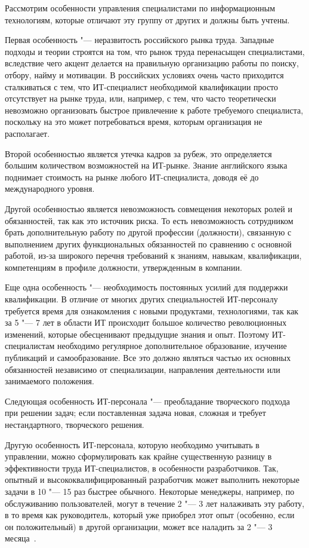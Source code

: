 \documentclass{../industrial-development}
\begin{document}
\lecturenotes

Рассмотрим особенности управления специалистами по информационным технологиям, которые отличают эту группу от других и должны быть учтены. 

Первая особенность "--- \alert{неразвитость российского рынка труда}. Западные подходы и теории строятся на том, что рынок труда перенасыщен специалистами, вследствие чего акцент делается на правильную организацию работы по поиску, отбору, найму и мотивации. В российских условиях очень часто приходится сталкиваться с тем, что ИТ-специалист необходимой квалификации просто отсутствует на рынке труда, или, например, с тем, что часто теоретически невозможно организовать быстрое привлечение к работе требуемого специалиста, поскольку на это может потребоваться время, которым организация не располагает. 

Второй особенностью является \alert{утечка кадров за рубеж}, это определяется большим количеством возможностей на ИТ-рынке. Знание английского языка поднимает стоимость на рынке любого ИТ-специалиста, доводя её до международного уровня. 

Другой особенностью является \alert{невозможность совмещения некоторых ролей и обязанностей}, так как это источник риска. То есть невозможность сотрудником брать дополнительную работу по другой профессии (должности), связанную с выполнением других функциональных обязанностей по сравнению с основной работой, из-за широкого перечня требований к знаниям, навыкам, квалификации, компетенциям в профиле должности, утвержденным в компании. 

Еще одна особенность "--- \alert{необходимость постоянных усилий для поддержки квалификации}. В отличие от многих других специальностей ИТ-персоналу требуется время для ознакомления с новыми продуктами, технологиями, так как за 5 "--- 7 лет в области ИТ происходит большое количество революционных изменений, которые обесценивают предыдущие знания и опыт. Поэтому ИТ-специалистам необходимо регулярное дополнительное образование, изучение публикаций и самообразование. Все это должно являться частью их основных обязанностей независимо от специализации, направления деятельности или занимаемого положения. 

Следующая особенность ИТ-персонала "--- \alert{преобладание творческого подхода при решении задач}; если поставленная задача новая, сложная и требует нестандартного, творческого решения.

Другую особенность ИТ-персонала, которую необходимо учитывать в управлении, можно сформулировать как \alert{крайне существенную разницу в эффективности труда ИТ-специалистов}, в особенности разработчиков. Так, опытный и высококвалифицированный разработчик может выполнить некоторые задачи в 10 "--- 15 раз быстрее обычного. Некоторые менеджеры, например, по обслуживанию пользователей, могут в течение 2 "--- 3 лет налаживать эту работу, в то время как руководитель, который уже приобрел этот опыт (особенно, если он положительный) в другой организации, может все наладить за 2 "--- 3 месяца~\cite[с.~51--52]{Tutunik}.
\end{document}
